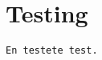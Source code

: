 \chapter{Testing}

\begin{lstlisting}[caption = The console output, label = lis:consOutput]
En testete test.
\end{lstlisting}